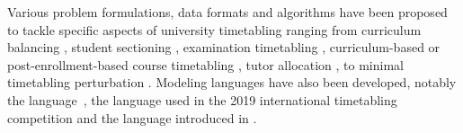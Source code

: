 
Various problem formulations, data formats and algorithms have been proposed to tackle specific aspects of university timetabling 
ranging from curriculum balancing \cite{2001_castro_ARXIV,2012_chiarandini_JH,2013_rubio_MPE}, student sectioning \cite{2010_muller_AOR,2019_schindl_AOR}, examination timetabling \cite{1996_carter_JORS,2020_battistutta_CPAIOR,2010_mccollum_INFORMS}, curriculum-based or post-enrollment-based course timetabling \cite{2010_mccollum_INFORMS,2015_bettinelli_TOP,2007_lewis_ITC,2012_cambazard_AOR,2017_goh_EJOR,2021_chen_IEEEA}, tutor allocation \cite{2022_caselli_ESWA}, to minimal timetabling perturbation \cite{2019_lindahl_EJOR,2020_lemos_JS}. 
Modeling languages have also been developed, notably the {\XHSTT} language~\cite{2012_ahmadi_AOR}, the {\ITC} language used in the 2019 international timetabling competition \cite{2018_muller_PATAT,2019_ITC} and the {\UTP} language introduced in \cite{2022_barichard_PATAT}.

